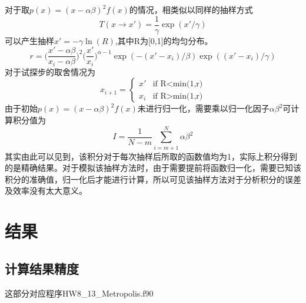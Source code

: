 \documentclass{article}
\begin{document}
对于取$ p(x)=(x-\alpha\beta)^2f(x) $的情况，相类似以同样的抽样方式
\begin{equation}
	T(x\rightarrow x')=\frac{1}{\gamma}\exp(x'/\gamma)
\end{equation}
可以产生抽样$ x'=-\gamma \ln(R) $,其中R为[0,1]的均匀分布。
\begin{equation}
	r=\big(\frac{x'-\alpha\beta}{x_i-\alpha\beta}\big)^2\big(\frac{x'}{x_i}\big)^{\alpha-1}\exp(-(x'-x_i)/\beta)\exp((x'-x_i)/\gamma)
\end{equation}
对于试探步的取舍情况为
\begin{equation}
	x_{i+1}=
	\begin{cases}
		x'&\text{if R<min(1,r)}\\
		x_i&\text{if R>min(1,r)}
	\end{cases}
\end{equation}
由于初始$ p(x)=(x-\alpha\beta)^2f(x) $未进行归一化，需要乘以归一化因子$ \alpha\beta^2 $可计算积分值为
\begin{equation}
	I=\frac{1}{N-m}\sum_{i=m+1}^{N}\alpha\beta^2
\end{equation}
其实由此可以见到，该积分对于每次抽样后所取的函数值均为1，实际上积分得到的是精确结果。对于模拟该抽样方法时，由于需要提前将函数归一化，需要已知该积分的准确值，归一化后才能进行计算，所以可见该抽样方法对于分析积分的误差及效率没有太大意义。
	\section{结果}
	\subsection{计算结果精度}
	这部分对应程序HW8\_13\_Metropolis.f90
	
\end{document}
